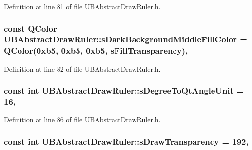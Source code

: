 Definition at line 81 of file U\-B\-Abstract\-Draw\-Ruler.\-h.

\hypertarget{class_u_b_abstract_draw_ruler_ab274e7ca2eeb2e2f2947af8d920c9389}{
\subsubsection[{s\-Dark\-Background\-Middle\-Fill\-Color}]{\setlength{\rightskip}{0pt plus 5cm}const Q\-Color U\-B\-Abstract\-Draw\-Ruler\-::s\-Dark\-Background\-Middle\-Fill\-Color = Q\-Color(0xb5, 0xb5, 0xb5, s\-Fill\-Transparency)\hspace{0.3cm}{\ttfamily [static]}, {\ttfamily [protected]}}}\label{d0/de1/class_u_b_abstract_draw_ruler_ab274e7ca2eeb2e2f2947af8d920c9389}


Definition at line 82 of file U\-B\-Abstract\-Draw\-Ruler.\-h.

\hypertarget{class_u_b_abstract_draw_ruler_a68d7e7147ed55b3a197d2fa90a30b84c}{
\subsubsection[{s\-Degree\-To\-Qt\-Angle\-Unit}]{\setlength{\rightskip}{0pt plus 5cm}const int U\-B\-Abstract\-Draw\-Ruler\-::s\-Degree\-To\-Qt\-Angle\-Unit = 16\hspace{0.3cm}{\ttfamily [static]}, {\ttfamily [protected]}}}\label{d0/de1/class_u_b_abstract_draw_ruler_a68d7e7147ed55b3a197d2fa90a30b84c}


Definition at line 86 of file U\-B\-Abstract\-Draw\-Ruler.\-h.

\hypertarget{class_u_b_abstract_draw_ruler_a052023f4bc0064aa6b1cf72f4e8b1b87}{
\subsubsection[{s\-Draw\-Transparency}]{\setlength{\rightskip}{0pt plus 5cm}const int U\-B\-Abstract\-Draw\-Ruler\-::s\-Draw\-Transparency = 192\hspace{0.3cm}{\ttfamily [static]}, {\ttfamily [protected]}}}\label{d0/de1/class_u_b_abstract_draw_ruler_a052023f4bc0064aa6b1cf72f4e8b1b87}


